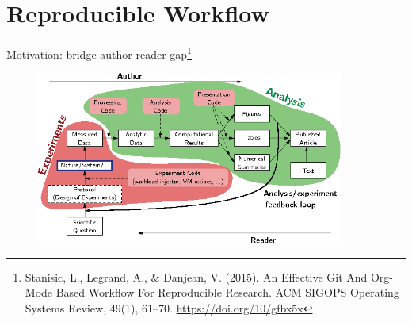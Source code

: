 \documentclass[10pt,aspectratio=169]{beamer}
\begin{document}
\section{Reproducible Workflow}
\begin{frame}{Motivation: bridge author-reader gap\footnote{Stanisic, L., Legrand, A., & Danjean, V. (2015). An Effective Git And Org-Mode Based Workflow For Reproducible Research. ACM SIGOPS Operating Systems Review, 49(1), 61–70. \tiny{\url{https://doi.org/10/gfbx5x}}
}}
    \begin{figure}
        \includegraphics[width=0.9\textwidth]{figures/intro_motivation.png}
    \end{figure}
    
\end{frame}
\end{document}

